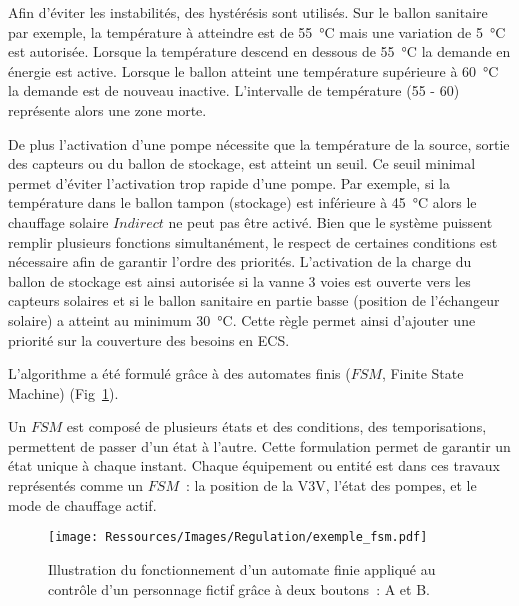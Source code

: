 Afin d’éviter les instabilités, des hystérésis sont utilisés. Sur le ballon sanitaire par
exemple, la température à atteindre est de \SI{55}{\celsius} mais une variation de
\SI{5}{\celsius} est autorisée. Lorsque la température descend en dessous de
\SI{55}{\celsius} la demande en énergie est active. Lorsque le ballon atteint une
température supérieure à \SI{60}{\celsius} la demande est de nouveau inactive.
L’intervalle de température (55 - 60) représente alors une zone morte.

De plus l’activation d’une pompe nécessite que la température de la source, sortie des
capteurs ou du ballon de stockage, est atteint un seuil. Ce seuil minimal permet d’éviter
l’activation trop rapide d’une pompe. Par exemple, si la température dans le ballon tampon
(stockage) est inférieure à \SI{45}{\celsius} alors le chauffage solaire $Indirect$ ne
peut pas être activé. Bien que le système puissent remplir plusieurs fonctions
simultanément, le respect de certaines conditions est nécessaire afin de garantir l’ordre
des priorités. L’activation de la charge du ballon de stockage est ainsi autorisée si la
vanne 3 voies est ouverte vers les capteurs solaires et si le ballon sanitaire en partie
basse (position de l’échangeur solaire) a atteint au minimum \SI{30}{\celsius}. Cette
règle permet ainsi d’ajouter une priorité sur la couverture des besoins en ECS.

L’algorithme a été formulé grâce à des automates finis ($FSM$, Finite State Machine) (Fig~\ref{fig:automate_fini}).

Un $FSM$ est composé de plusieurs états et des conditions, des temporisations, permettent
de passer d’un état à l’autre. Cette formulation permet de garantir un état unique à chaque
instant. Chaque équipement ou entité est dans ces travaux représentés comme un $FSM$~: la
position de la V3V, l’état des pompes, et le mode de chauffage actif.

\begin{figure}
    \begin{center}
        \texttt{[image: Ressources/Images/Regulation/exemple\_fsm.pdf]}
    \end{center}
    \caption{Illustration du fonctionnement d’un automate finie appliqué au contrôle
             d’un personnage fictif grâce à deux boutons~: A et B.
             \label{fig:automate_fini}}
\end{figure}

